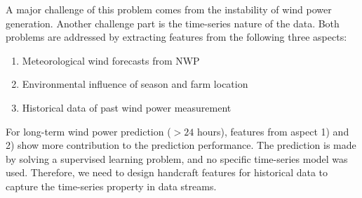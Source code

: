 \documentclass[conference]{IEEEtran}
\begin{document}
A major challenge of this problem comes from the instability of wind power generation. Another challenge part is the time-series nature of the data. Both problems are addressed by extracting features from the following three aspects:
\begin{enumerate}
\item Meteorological wind forecasts from NWP
\item Environmental influence of season and farm location
\item Historical data of past wind power measurement
\end{enumerate}

For long-term wind power prediction ($> 24$ hours), features from aspect 1) and 2) show more contribution to the prediction performance. The prediction is made by solving a supervised learning problem, and no specific time-series model was used. Therefore, we need to design handcraft features for historical data to capture the time-series property in data streams.
\end{document}
